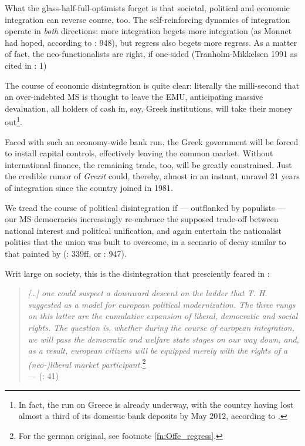 \documentclass[11pt,a4paper,oneside,openright]{article}
\begin{document}
What the glass-half-full-optimists forget is that societal, political and economic integration can reverse course, too. 
The self-reinforcing dynamics of integration operate in \emph{both} directions: 
more integration begets more integration (as Monnet had hoped, according to \citealt{Schmitter1999}: 948), but regress also begets more regress. 
As a matter of fact, the neo-functionalists are right, if one-sided (Tranholm-Mikkelsen 1991 as cited in \citealt{Bieler2003}: 1)

The course of economic disintegration is quite clear: 
literally the milli-second that an over-indebted \gls{MS} is thought to leave the \gls{EMU}, anticipating massive devaluation, all holders of cash in, say, Greek institutions, will take their money out\footnote{
	In fact, the run on Greece is already underway, with the country having lost almost a third of its domestic bank deposits by May 2012, according to \cite{TheEconomist2012}.}. 
	
Faced with such an economy-wide bank run, the Greek government will be forced to install capital controls, effectively leaving the common market. 
Without international finance, the remaining trade, too, will be greatly constrained. 
Just the credible rumor of \emph{Grexit} could, thereby, almost in an instant, unravel 21 years of integration since the country joined in 1981.

We tread the course of political disintegration if --- outflanked by populists --- our \gls{MS} democracies increasingly re-embrace the supposed trade-off between national interest and political unification, and again entertain the nationalist politics that the union was built to overcome, in a scenario of decay similar to that painted by \citeauthor{BeckGrande-2007-aa} (\citeauthor{BeckGrande-2007-aa}: 339ff, or \citealt{Schmitter1999}: 947).

Writ large on society, this is the disintegration that \citeauthor{Offe1998} presciently feared in \citeyear{Offe1998}:
\begin{quote}
	\emph{[\ldots] one could suspect a downward descent on the ladder that T. H. \cite{Marshall-1950-aa} suggested as a model for european political modernization. 
	The three rungs on this latter are the cumulative expansion of liberal, democratic and social rights. 
	The question is, whether during the course of european integration, we will pass the democratic and welfare state stages on our way down, and, as a result, european citizens will be equipped merely with the rights of a (neo-)liberal market participant.}\footnote{
		For the german original, see footnote \ref{fn:Offe_regress}.}\\
	--- \citeauthor{Offe1998} (\citeyear{Offe1998}: 41)
\end{quote}
\end{document}
